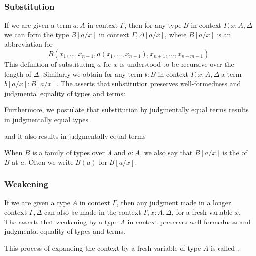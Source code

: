 \subsubsection*{Substitution}
If we are given a term $a:A$ in context $\Gamma$, then for any type $B$ in context $\Gamma,x:A,\Delta$ we can form the type $B[a/x]$ in context $\Gamma,\Delta[a/x]$, where $B[a/x]$ is an abbreviation for
\begin{equation*}
B(x_1,\ldots,x_{n-1},a(x_1,\ldots,x_{n-1}),x_{n+1},\ldots,x_{n+m-1})
\end{equation*}
This definition of substituting $a$ for $x$ is understood to be recursive over the length of $\Delta$. Similarly we obtain for any term $b:B$ in context $\Gamma,x:A,\Delta$ a term $b[a/x]:B[a/x]$. The  asserts that substitution preserves well-formedness and judgmental equality of types and terms:
\begin{prooftree}
\end{prooftree}
Furthermore, we postulate that substitution by judgmentally equal terms results in judgmentally equal types
\begin{prooftree}
\end{prooftree}
and it also results in judgmentally equal terms
\begin{prooftree}
\end{prooftree}
When $B$ is a family of types over $A$ and $a:A$, we also say that $B[a/x]$ is the  of $B$ at $a$. Often we write $B(a)$ for $B[a/x]$.

\subsubsection*{Weakening}
If we are given a type $A$ in context $\Gamma$, then any judgment made in a longer context $\Gamma,\Delta$ can also be made in the context $\Gamma,x:A,\Delta$, for a fresh variable $x$. The  asserts that weakening by a type $A$ in context preserves well-formedness and judgmental equality of types and terms.
\begin{prooftree}
\end{prooftree}
This process of expanding the context by a fresh variable of type $A$ is called .

